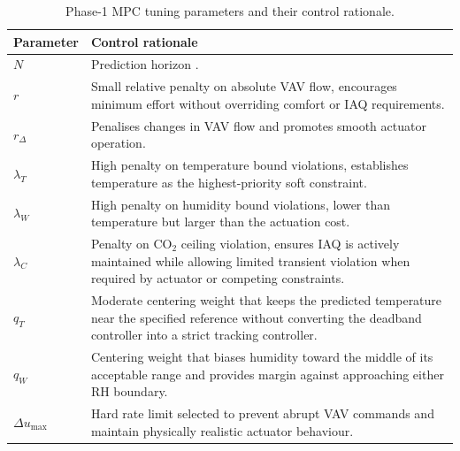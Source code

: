 \documentclass[12pt, a4paper]{article}
\begin{document}
	\begin{table}[ht]
		\centering
		\caption{Phase-1 MPC tuning parameters and their control rationale.}
		\label{tab:MPC_tuning}
		\begin{tabular}{p{}p{}}
			\toprule
			\textbf{Parameter} & \textbf{Control rationale} \\
			\midrule
			
			$N$
			& Prediction horizon . \\[2pt]
			
			$r$
			& Small relative penalty on absolute VAV flow, encourages minimum  effort without overriding comfort or IAQ requirements. \\[2pt]
			
			$r_\Delta$
			& Penalises changes in VAV flow and promotes smooth actuator operation. \\[2pt]
			
			$\lambda_T$
			& High penalty on temperature bound violations, establishes temperature as the highest-priority soft constraint. \\[2pt]
			
			$\lambda_W$
			& High penalty on humidity bound violations, lower than temperature but  larger than the actuation cost. \\[2pt]
			
			$\lambda_C$
			& Penalty on CO$_2$ ceiling violation, ensures IAQ is actively maintained while allowing limited transient violation when required by actuator or competing constraints. \\[2pt]
			
			$q_T$
			& Moderate centering weight that keeps the predicted temperature near the specified reference without converting the deadband controller into a strict tracking controller. \\[2pt]
			
			$q_W$
			& Centering weight that biases humidity toward the middle of its acceptable range and provides margin against approaching either RH boundary. \\[2pt]
			
			$\Delta u_{\max}$
			& Hard rate limit selected to prevent abrupt VAV commands and maintain physically realistic actuator behaviour. \\
			
			\bottomrule
		\end{tabular}
	\end{table}

	\newpage
\end{document}
